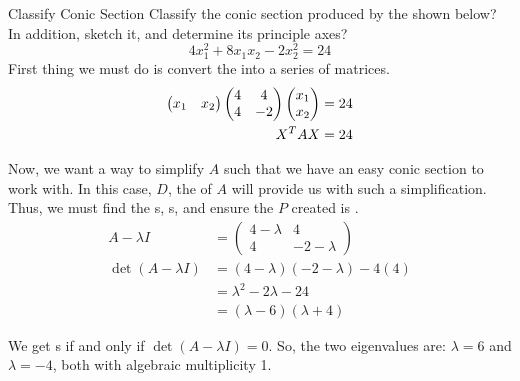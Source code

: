 \begin{example}{Classify Conic Section}
  Classify the conic section produced by the  shown below?
  In addition, sketch it, and determine its principle axes?
  \begin{equation*}
    4x_{1}^{2} + 8x_{1}x_{2} - 2x_{2}^{2} = 24
  \end{equation*}
  \tcblower{}
  First thing we must do is convert the  into a series of matrices.
  \begin{align*}
    \begin{pmatrix}
      x_{1} & x_{2}
    \end{pmatrix}
              \begin{pmatrix}
                4 & 4 \\
                4 & -2
              \end{pmatrix}
                    \begin{pmatrix}
                      x_{1} \\ x_{2}
                    \end{pmatrix} &= 24 \\
    {X}^{T} A X &= 24
  \end{align*}

  Now, we want a way to simplify $A$ such that we have an easy conic section to work with.
  In this case, $D$, the  of $A$ will provide us with such a simplification.
  Thus, we must find the s, s, and ensure the $P$ created is .
  \begin{align*}
    A - \lambda I &=
                    \begin{pmatrix}
                      4 - \lambda & 4 \\
                      4 & -2 - \lambda
                    \end{pmatrix} \\
    \det(A - \lambda I) &= (4 - \lambda) (-2 - \lambda) - 4 (4) \\
                  &= \lambda^{2} - 2 \lambda - 24 \\
                  &= (\lambda - 6) (\lambda + 4)
  \end{align*}

  We get s if and only if $\det(A-\lambda I) = 0$.
  So, the two eigenvalues are: $\lambda = 6$ and $\lambda = -4$, both with algebraic multiplicity 1.


\end{example}
